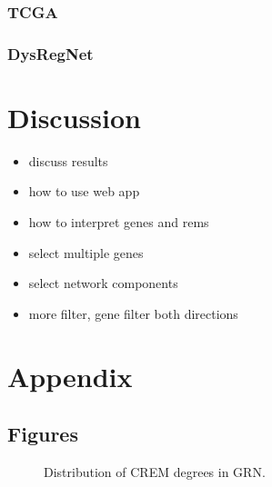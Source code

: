 \documentclass[pdftex,12pt,a4paper]{report}
\begin{document}
\subsection{TCGA}
\subsection{DysRegNet}

\chapter{Discussion}
\begin{itemize}
	\item discuss results
	\item how to use web app
	\item how to interpret genes and rems
	\item select multiple genes
	\item select network components
	\item more filter, gene filter both directions
\end{itemize}


\medskip
\clearpage



\pagebreak
\appendix
\chapter{Appendix}
\section{Figures}
\begin{figure}[!ht]
\begin{center}
	\caption{Distribution of CREM degrees in GRN.}
	\label{crem_degree}
\end{center}
\end{figure}
\end{document}
